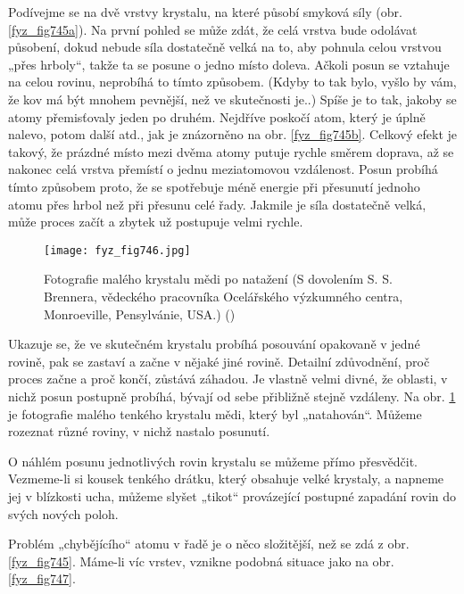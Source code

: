     Podívejme se na dvě vrstvy krystalu, na které působí smyková síly (obr. \ref{fyz_fig745a}). Na 
    první pohled se může zdát, že celá vrstva bude odolávat působení, dokud nebude síla dostatečně 
    velká na to, aby pohnula celou vrstvou „přes hrboly“, takže ta se posune o jedno místo doleva. 
    Ačkoli posun se vztahuje na celou rovinu, neprobíhá to tímto způsobem. (Kdyby to tak bylo, 
    vyšlo by vám, že kov má být mnohem pevnější, než ve skutečnosti je..) Spíše je to tak, jakoby 
    se atomy přemisťovaly jeden po druhém. Nejdříve poskočí atom, který je úplně nalevo, potom 
    další atd., jak je znázorněno na obr. \ref{fyz_fig745b}. Celkový efekt je takový, že prázdné 
    místo mezi dvěma atomy putuje rychle směrem doprava, až se nakonec celá vrstva přemístí o jednu 
    meziatomovou vzdálenost. Posun probíhá tímto způsobem proto, že se spotřebuje méně energie při 
    přesunutí jednoho atomu přes hrbol než při přesunu celé řady. Jakmile je síla dostatečně velká, 
    může proces začít a zbytek už postupuje velmi rychle.
    
    
    \begin{figure}[ht!] %
      \centering
      \texttt{[image: fyz\_fig746.jpg]}
      \caption{Fotografie malého krystalu mědi po natažení (S dovolením S. S. Brennera, vědeckého 
               pracovníka Ocelářského výzkumného centra, Monroeville, Pensylvánie, USA.)
               (\cite[s.~552]{Feynman02})}
      \label{fyz_fig746}
    \end{figure}
    
    Ukazuje se, že ve skutečném krystalu probíhá posouvání opakovaně v jedné rovině, pak se zastaví 
    a začne v nějaké jiné rovině. Detailní zdůvodnění, proč proces začne a proč končí, zůstává 
    záhadou. Je vlastně velmi divné, že oblasti, v nichž posun postupně probíhá, bývají od sebe 
    přibližně stejně vzdáleny. Na obr. \ref{fyz_fig746} je fotografie malého tenkého krystalu mědi, 
    který byl „natahován“. Můžeme rozeznat různé roviny, v nichž nastalo posunutí.
    
    O náhlém posunu jednotlivých rovin krystalu se můžeme přímo přesvědčit. Vezmeme-li si kousek 
    tenkého drátku, který obsahuje velké krystaly, a napneme jej v blízkosti ucha, můžeme slyšet 
    „tikot“ provázející postupné zapadání rovin do svých nových poloh. 
    
    Problém „chybějícího“ atomu v řadě je o něco složitější, než se zdá z obr. \ref{fyz_fig745}. 
    Máme-li víc vrstev, vznikne podobná situace jako na obr. \ref{fyz_fig747}. 
    
